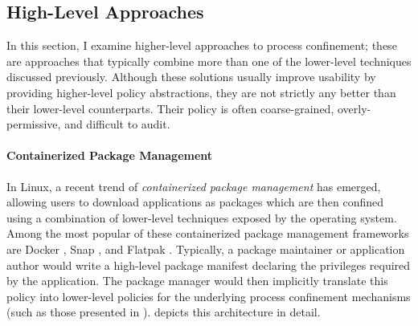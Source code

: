 \documentclass[dvipsnames, 12pt]{article}
\begin{document}

\subsection{High-Level Approaches}
\label{sec:high-level}

In this section, I examine higher-level approaches to process confinement; these
are approaches that typically combine more than one of the lower-level
techniques discussed previously. Although these solutions usually improve
usability by providing higher-level policy abstractions, they are not strictly
any better than their lower-level counterparts. Their policy is often
coarse-grained, overly-permissive, and difficult to audit.


\paragraph*{Containerized Package Management} In Linux, a recent trend of
\textit{containerized package management} has emerged, allowing users to
download applications as packages which are then confined using a combination of
lower-level techniques exposed by the operating system. Among the most popular
of these containerized package management frameworks are Docker \cite{docker},
Snap \cite{snap}, and Flatpak \cite{flatpak}. Typically, a package maintainer or
application author would write a high-level package manifest declaring the
privileges required by the application. The package manager would then
implicitly translate this policy into lower-level policies for the underlying
process confinement mechanisms (such as those presented in
).  depicts this architecture in
detail.
\end{document}
